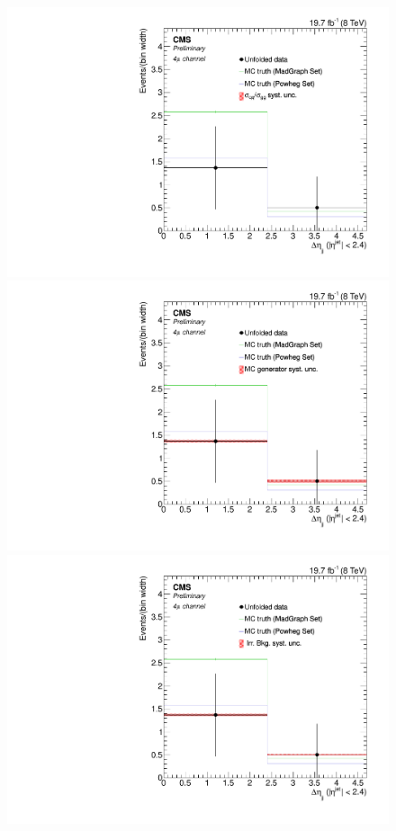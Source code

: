 \begin{figure}[hbtp]
 \begin{center}
   \includegraphics[width=0.8\cmsFigWidth]{Figures/Unfolding/Systematics/ZZTo4m_CentralDeta_qqgg_Mad_fr}     
   \includegraphics[width=0.8\cmsFigWidth]{Figures/Unfolding/Systematics/ZZTo4m_CentralDeta_MCgen_Mad_fr}     
   \includegraphics[width=0.8\cmsFigWidth]{Figures/Unfolding/Systematics/ZZTo4m_CentralDeta_IrrBkg_Mad_fr}

\end{center}
\end{figure}
